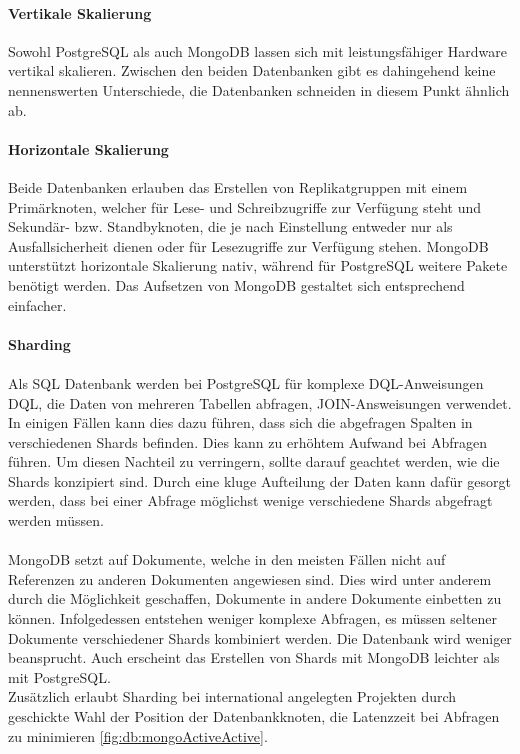\paragraph{Vertikale Skalierung\\}
Sowohl PostgreSQL als auch MongoDB lassen sich mit leistungsfähiger Hardware vertikal skalieren.
Zwischen den beiden Datenbanken gibt es dahingehend keine nennenswerten Unterschiede, die Datenbanken schneiden in diesem Punkt ähnlich ab.

\paragraph{Horizontale Skalierung\\}
Beide Datenbanken erlauben das Erstellen von Replikatgruppen mit einem Primärknoten, welcher für Lese- und Schreibzugriffe zur Verfügung steht und Sekundär- bzw. Standbyknoten, die je nach Einstellung entweder nur als Ausfallsicherheit dienen oder für Lesezugriffe zur Verfügung stehen.
MongoDB unterstützt horizontale Skalierung nativ, während für PostgreSQL weitere Pakete benötigt werden. \cite{db:mongoVsPostgres}
Das Aufsetzen von MongoDB gestaltet sich entsprechend einfacher.

\paragraph{Sharding\\}
\paragraph{}
Als SQL Datenbank werden bei PostgreSQL für komplexe DQL-Anweisungen \gls{DQL}, die Daten von mehreren Tabellen abfragen, JOIN-Answeisungen verwendet.
In einigen Fällen kann dies dazu führen, dass sich die abgefragen Spalten in verschiedenen Shards befinden.
Dies kann zu erhöhtem Aufwand bei Abfragen führen.
Um diesen Nachteil zu verringern, sollte darauf geachtet werden, wie die Shards konzipiert sind.
Durch eine kluge Aufteilung der Daten kann dafür gesorgt werden, dass bei einer Abfrage möglichst wenige verschiedene Shards abgefragt werden müssen.

\paragraph{}
MongoDB setzt auf Dokumente, welche in den meisten Fällen nicht auf Referenzen zu anderen Dokumenten angewiesen sind.
Dies wird unter anderem durch die Möglichkeit geschaffen, Dokumente in andere Dokumente einbetten zu können.
Infolgedessen entstehen weniger komplexe Abfragen, es müssen seltener Dokumente verschiedener Shards kombiniert werden.
Die Datenbank wird weniger beansprucht.
Auch erscheint das Erstellen von Shards mit MongoDB leichter als mit PostgreSQL.\\
Zusätzlich erlaubt Sharding bei international angelegten Projekten durch geschickte Wahl der Position der Datenbankknoten, die Latenzzeit bei Abfragen zu minimieren \autoref{fig:db:mongoActiveActive}.

